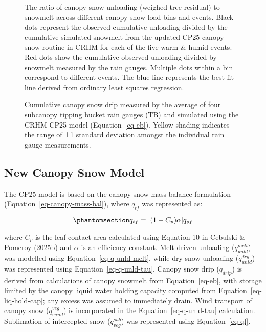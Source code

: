 \documentclass[
]{agujournal2019}
\begin{document}
\begin{figure}[htbp]


\caption{\label{fig-unld-melt-ratio}The ratio of canopy snow unloading
(weighed tree residual) to snowmelt across different canopy snow load
bins and events. Black dots represent the observed cumulative unloading
divided by the cumulative simulated snowmelt from the updated CP25
canopy snow routine in CRHM for each of the five warm \& humid events.
Red dots show the cumulative observed unloading divided by snowmelt
measured by the rain gauges. Multiple dots within a bin correspond to
different events. The blue line represents the best-fit line derived
from ordinary least squares regression.}

\end{figure}%

\begin{figure}[htbp]


\caption{\label{fig-cml-tb}Cumulative canopy snow drip measured by the
average of four subcanopy tipping bucket rain gauges (TB) and simulated
using the CRHM CP25 model (Equation~\ref{eq-eb}). Yellow shading
indicates the range of ±1 standard deviation amongst the individual rain
gauge measurements.}

\end{figure}%

\subsection{New Canopy Snow Model}\label{new-canopy-snow-model}

The CP25 model is based on the canopy snow mass balance formulation
(Equation~\ref{eq-canopy-mass-bal}), where \(q_{tf}\) was represented
as:

\begin{equation}\phantomsection\label{eq-qtf}{
q_{tf} = [(1 - C_p)  \alpha] q_{sf}
}\end{equation}

where \(C_p\) is the leaf contact area calculated using Equation 10 in
Cebulski \& Pomeroy (2025b) and \(\alpha\) is an efficiency constant.
Melt-driven unloading (\(q_{unld}^{melt}\)) was modelled using
Equation~\ref{eq-q-unld-melt}, while dry snow unloading
(\(q_{unld}^{dry}\)) was represented using Equation~\ref{eq-q-unld-tau}.
Canopy snow drip (\(q_{drip}\)) is derived from calculations of canopy
snowmelt from Equation~\ref{eq-eb}, with storage limited by the canopy
liquid water holding capacity computed from
Equation~\ref{eq-liq-hold-cap}; any excess was assumed to immediately
drain. Wind transport of canopy snow (\(q_{wind}^{veg}\)) is
incorporated in the Equation~\ref{eq-q-unld-tau} calculation.
Sublimation of intercepted snow (\(q_{veg}^{sub}\)) was represented
using Equation~\ref{eq-ql}.
\end{document}
